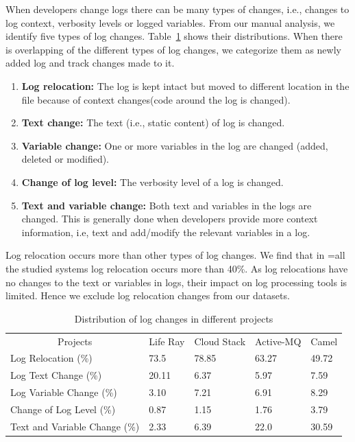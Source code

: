 When developers change logs there can be many types of changes, i.e., changes to log context, verbosity levels or logged variables. From our manual analysis, we identify five types of log changes. Table~\ref{tba:logtype} shows their distributions. When there is overlapping of the different types of log changes, we categorize them as newly added log and track changes made to it.
\begin{enumerate}

\item { \textbf{Log relocation:} } The log is kept intact but moved to different location in the file because of context changes(code around the log is changed).

\item \textbf{Text change:} The text (i.e., static content) of log is changed. 

\item\textbf{Variable change:} One or more variables in the log are changed (added, deleted or modified).

\item \textbf{Change of log level:} The verbosity level of a log is changed.

\item  \textbf{Text and variable change:} Both text and variables in the logs are changed. This is generally done when developers provide more context information, i.e, text and add/modify the relevant variables in a log.

\end{enumerate}

Log relocation occurs more than other types of log changes. We find that in =all the studied systems log relocation occurs more than 40\%. As log relocations have no changes to the text or variables in logs, their impact on log processing tools is limited. Hence we exclude log relocation changes from our datasets. 


\begin{table}[t]
	\centering
	\caption{Distribution of log changes in different projects}
	\label{tba:logtype}
	\begin{tabular}{l|llll}
		\cline{1-5}  	\multicolumn{1}{|c}{Projects}    & \multicolumn{1}{|c}{ Life Ray }  &  \multicolumn{1}{|c}{ Cloud Stack}	   &  \multicolumn{1}{|c}{ Active-MQ }  & 
		 \multicolumn{1}{|c|}{ Camel } \\ \cline{1-5}   
		
		Log Relocation (\%)       & 73.5     & 78.85 &  63.27  & 49.72         \\
		
		Log Text Change (\%)      & 20.11    & 6.37 & 5.97    & 7.59       \\
		Log Variable Change (\%)   & 3.10     & 7.21 & 6.91 &  8.29     \\
		Change of Log Level (\%) & 0.87   & 1.15 & 1.76  &  3.79       \\ 
		Text and Variable Change (\%) & 2.33     & 6.39 & 22.0   &  30.59    \\ \cline{1-5}
	\end{tabular}
\end{table}

